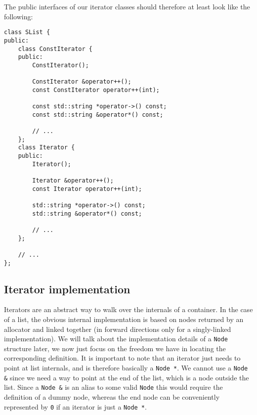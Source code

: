 The public interfaces of our iterator classes should therefore at least look like the following:
\begin{lstlisting}[frame=single, caption={SList.h}]
class SList {
public:
    class ConstIterator {
    public:
        ConstIterator();
    
        ConstIterator &operator++();
        const ConstIterator operator++(int);
        
        const std::string *operator->() const;
        const std::string &operator*() const;
        
        // ...
    };
    class Iterator {
    public:
        Iterator();
    
        Iterator &operator++();
        const Iterator operator++(int);
        
        std::string *operator->() const;
        std::string &operator*() const;
        
        // ...
    };
    
    // ...
};
\end{lstlisting}

\subsection{Iterator implementation}
Iterators are an abstract way to walk over the internals of a container. In the case of a list, the obvious internal implementation is based on nodes returned by an allocator and linked together (in forward directions only for a singly-linked implementation). We will talk about the implementation details of a \lstinline!Node! structure later, we now just focus on the freedom we have in locating the corresponding definition. It is important to note that an iterator just needs to point at list internals, and is therefore basically a \lstinline!Node *!. We cannot use a \lstinline!Node &! since we need a way to point at the end of the list, which is a node outside the list. Since a \lstinline!Node &! is an alias to some valid \lstinline!Node! this would require the definition of a dummy node, whereas the end node can be conveniently represented by \lstinline!0! if an iterator is just a \lstinline!Node *!.

